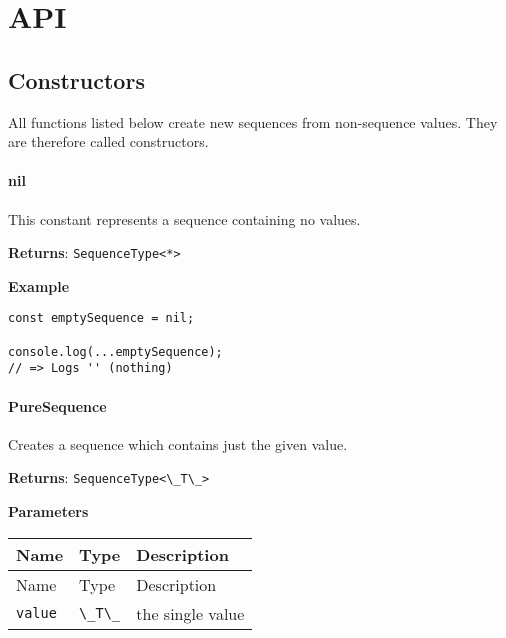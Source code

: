 \newcommand{\passthrough}[1]{#1}

\providecommand{\tightlist}{%
  \setlength{\itemsep}{0pt}\setlength{\parskip}{0pt}}
\hypertarget{api}{%
\chapter{API}\label{api}}

\hypertarget{fa229d10-532a-4f04-9805-8fdc4881587a}{%
\section{Constructors}\label{fa229d10-532a-4f04-9805-8fdc4881587a}}

All functions listed below create new sequences from non-sequence
values. They are therefore called constructors.

\hypertarget{eb038883-6cbc-4daf-ad04-f8c2e25f9a33}{%
\subsubsection{nil}\label{eb038883-6cbc-4daf-ad04-f8c2e25f9a33}}

This constant represents a sequence containing no values.

\textbf{Returns}: \passthrough{\lstinline!SequenceType<*>!}

\textbf{Example}

\begin{lstlisting}[label=5c45c9fa-4663-4eae-8965-8bea240591b4]
const emptySequence = nil;
                              
console.log(...emptySequence);
// => Logs '' (nothing)
\end{lstlisting}

\hypertarget{c35d49b1-5a40-4fb7-b9cd-225357873654}{%
\subsubsection{PureSequence}\label{c35d49b1-5a40-4fb7-b9cd-225357873654}}

Creates a sequence which contains just the given value.

\textbf{Returns}: \passthrough{\lstinline!SequenceType<\_T\_>!}

\textbf{Parameters}

\begin{longtable}[]{
  >{\raggedright\arraybackslash}p{}
  >{\raggedright\arraybackslash}p{}
  >{\raggedright\arraybackslash}p{}@{}}

\toprule\noalign{}
Name & Type & Description \\
\midrule\noalign{}
\endfirsthead
\toprule\noalign{}
Name & Type & Description \\
\midrule\noalign{}
\endhead
\bottomrule\noalign{}
\endlastfoot
\passthrough{\lstinline!value!} & \passthrough{\lstinline!\_T\_!} & the
single value \\
\end{longtable}

